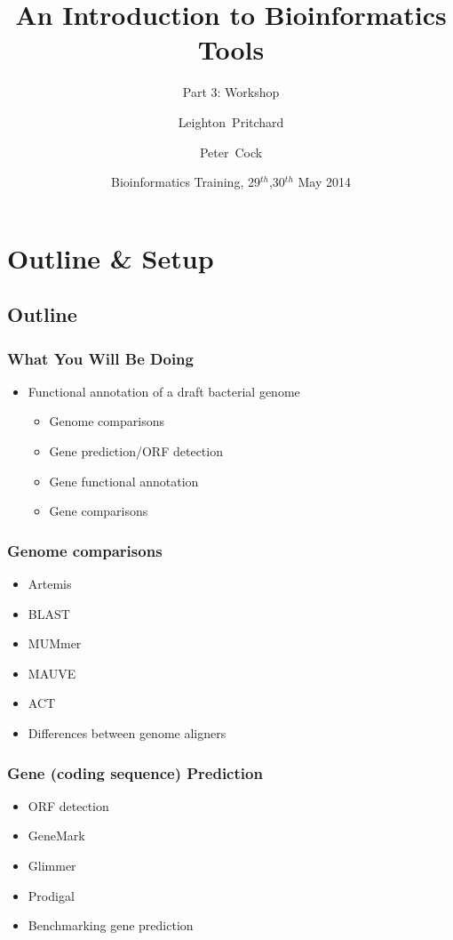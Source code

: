 \documentclass[table]{beamer}
\title[Intro to Bioinformatics] %
{An Introduction to Bioinformatics Tools}
\subtitle{Part 3: Workshop}
\author[Pritchard, Cock] %
{Leighton~Pritchard \and Peter~Cock}
\institute[The James Hutton Institute] %
{
  Information and Computational Sciences\\
  The James Hutton Institute
}
\date[May 2014] %
{Bioinformatics Training, 29$^{th}$,30$^{th}$ May 2014}
\begin{document}
  \frame[plain]{\titlepage}
  
\section{Outline \& Setup}
\subsection{Outline}

    \begin{frame}
     \frametitle{What You Will Be Doing}
     \begin{itemize}
       \item Functional annotation of a draft bacterial genome
       \begin{itemize}
         \item Genome comparisons
         \item Gene prediction/ORF detection
         \item Gene functional annotation
         \item Gene comparisons
       \end{itemize}
     \end{itemize}
    \end{frame}
    
    \begin{frame}
     \frametitle{Genome comparisons}
     \begin{itemize}
       \item Artemis
       \item BLAST
       \item MUMmer
       \item MAUVE
       \item ACT
       \item Differences between genome aligners
     \end{itemize}
    \end{frame}

    \begin{frame}
     \frametitle{Gene (coding sequence) Prediction}
     \begin{itemize}
       \item ORF detection
       \item GeneMark
       \item Glimmer
       \item Prodigal
       \item Benchmarking gene prediction
     \end{itemize}
    \end{frame}
\end{document}
